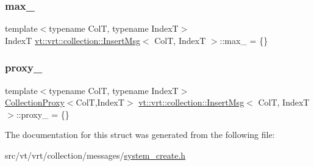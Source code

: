 \mbox{\label{structvt_1_1vrt_1_1collection_1_1_insert_msg_a8e6cba1aa922c74d219db407343530b1}} 
\subsubsection{\texorpdfstring{max\+\_\+}{max\_}}
{\footnotesize\ttfamily template$<$typename ColT, typename IndexT$>$ \\
IndexT \hyperlink{structvt_1_1vrt_1_1collection_1_1_insert_msg}{vt\+::vrt\+::collection\+::\+Insert\+Msg}$<$ ColT, IndexT $>$\+::max\+\_\+ = \{\}}

\mbox{\label{structvt_1_1vrt_1_1collection_1_1_insert_msg_a7f679b8e031239c31fe8061e9a18f568}} 
\subsubsection{\texorpdfstring{proxy\+\_\+}{proxy\_}}
{\footnotesize\ttfamily template$<$typename ColT, typename IndexT$>$ \\
\hyperlink{structvt_1_1vrt_1_1collection_1_1_collection_proxy}{Collection\+Proxy}$<$ColT,IndexT$>$ \hyperlink{structvt_1_1vrt_1_1collection_1_1_insert_msg}{vt\+::vrt\+::collection\+::\+Insert\+Msg}$<$ ColT, IndexT $>$\+::proxy\+\_\+ = \{\}}



The documentation for this struct was generated from the following file\+:\begin{DoxyCompactItemize}
\item 
src/vt/vrt/collection/messages/\hyperlink{system__create_8h}{system\+\_\+create.\+h}\end{DoxyCompactItemize}
